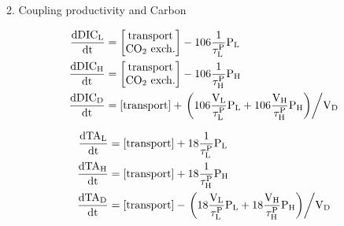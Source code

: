 \begin{frame}{2. Coupling productivity and Carbon}

\begin{align*}
    \mathrm{\frac{\mathrm{d}DIC_L}{\mathrm{d}t}} &= \mathrm{\begin{bmatrix} \mathrm{transport} \\ \mathrm{CO_2~exch.}\end{bmatrix} - 106 \frac{1}{\tau^P_L} P_L} \\
    \mathrm{\frac{\mathrm{d}DIC_H}{\mathrm{d}t}} &= \mathrm{\begin{bmatrix} \mathrm{transport} \\ \mathrm{CO_2~exch.}\end{bmatrix} - 106 \frac{1}{\tau^P_H} P_H} \\
    \mathrm{\frac{\mathrm{d}DIC_D}{\mathrm{d}t}} &= \mathrm{[\mathrm{transport}] + \left. \left( 106 \frac{V_L}{\tau^P_L} P_L + 106 \frac{V_H}{\tau^P_H} P_H \right) \middle / V_D \right.}
\end{align*}

\begin{align*}
    \mathrm{\frac{\mathrm{d}TA_L}{\mathrm{d}t}} &= \mathrm{[\mathrm{transport}] + 18 \frac{1}{\tau^P_L} P_L} \\
    \mathrm{\frac{\mathrm{d}TA_H}{\mathrm{d}t}} &= \mathrm{[\mathrm{transport}] + 18 \frac{1}{\tau^P_H} P_H} \\
    \mathrm{\frac{\mathrm{d}TA_D}{\mathrm{d}t}} &= \mathrm{[\mathrm{transport}] - \left. \left( 18 \frac{V_L}{\tau^P_L} P_L + 18 \frac{V_H}{\tau^P_H} P_H \right) \middle / V_D \right.}
\end{align*}

\end{frame}




